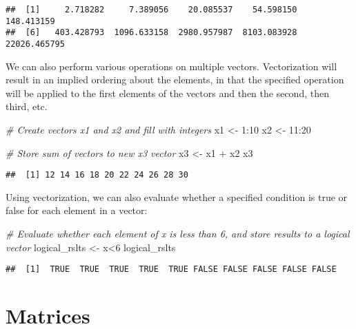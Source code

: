 \documentclass[
]{book}
\newenvironment{Shaded}{\begin{snugshade}}{\end{snugshade}}
\newcommand{\CommentTok}[1]{\textcolor[rgb]{0.56,0.35,0.01}{\textit{#1}}}
\newcommand{\DecValTok}[1]{\textcolor[rgb]{0.00,0.00,0.81}{#1}}
\newcommand{\NormalTok}[1]{#1}
\newcommand{\OtherTok}[1]{\textcolor[rgb]{0.56,0.35,0.01}{#1}}
\newcommand{\SpecialCharTok}[1]{\textcolor[rgb]{0.00,0.00,0.00}{#1}}
\begin{document}
\begin{verbatim}
##  [1]     2.718282     7.389056    20.085537    54.598150   148.413159
##  [6]   403.428793  1096.633158  2980.957987  8103.083928 22026.465795
\end{verbatim}

We can also perform various operations on multiple vectors. Vectorization will result in an implied ordering about the elements, in that the specified operation will be applied to the first elements of the vectors and then the second, then third, etc.

\begin{Shaded}
\begin{Highlighting}[]
\CommentTok{\# Create vectors x1 and x2 and fill with integers}
\NormalTok{x1 }\OtherTok{\textless{}{-}} \DecValTok{1}\SpecialCharTok{:}\DecValTok{10}
\NormalTok{x2 }\OtherTok{\textless{}{-}} \DecValTok{11}\SpecialCharTok{:}\DecValTok{20}

\CommentTok{\# Store sum of vectors to new x3 vector}
\NormalTok{x3 }\OtherTok{\textless{}{-}}\NormalTok{ x1 }\SpecialCharTok{+}\NormalTok{ x2}
\NormalTok{x3}
\end{Highlighting}
\end{Shaded}

\begin{verbatim}
##  [1] 12 14 16 18 20 22 24 26 28 30
\end{verbatim}

Using vectorization, we can also evaluate whether a specified condition is true or false for each element in a vector:

\begin{Shaded}
\begin{Highlighting}[]
\CommentTok{\# Evaluate whether each element of x is less than 6, and store results to a logical vector}
\NormalTok{logical\_rslts }\OtherTok{\textless{}{-}}\NormalTok{ x}\SpecialCharTok{\textless{}}\DecValTok{6}
\NormalTok{logical\_rslts}
\end{Highlighting}
\end{Shaded}

\begin{verbatim}
##  [1]  TRUE  TRUE  TRUE  TRUE  TRUE FALSE FALSE FALSE FALSE FALSE
\end{verbatim}

\hypertarget{matrices}{%
\section{Matrices}\label{matrices}}
\end{document}
